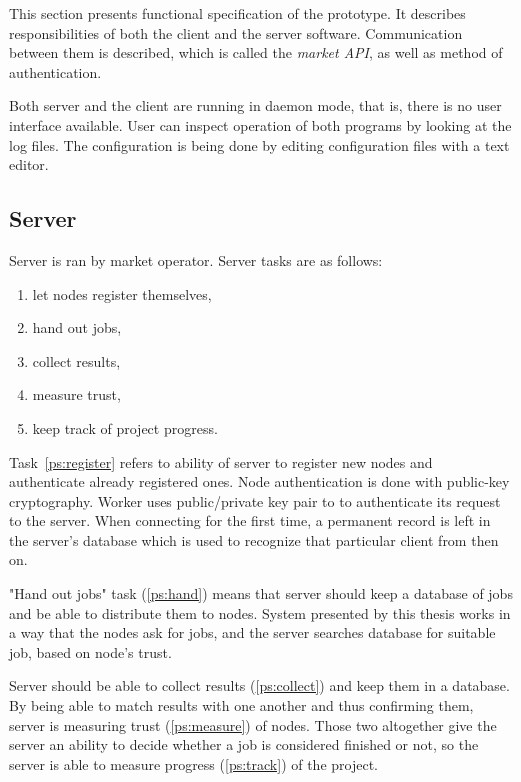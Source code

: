 This section presents functional specification of the prototype. It describes responsibilities of both the client and the server software. Communication between them is described, which is called the \emph{market API}, as well as method of authentication.

Both server and the client are running in daemon mode, that is, there is no user interface available. User can inspect operation of both programs by looking at the log files. The configuration is being done by editing configuration files with a text editor.

\subsection{Server}

Server is ran by market operator. Server tasks are as follows:

\begin{enumerate}
	\item \label{ps:register} let nodes register themselves,
	\item \label{ps:hand} hand out jobs,
	\item \label{ps:collect} collect results,
	\item \label{ps:measure} measure trust,
	\item \label{ps:track} keep track of project progress.
\end{enumerate}

Task~\ref{ps:register} refers to ability of server to register new nodes and authenticate already registered ones. Node authentication is done with public-key cryptography. Worker uses public/private key pair to to authenticate its request to the server. When connecting for the first time, a permanent record is left in the server's database which is used to recognize that particular client from then on.

"Hand out jobs" task (\ref{ps:hand}) means that server should keep a database of jobs and be able to distribute them to nodes. System presented by this thesis works in a way that the nodes ask for jobs, and the server searches database for suitable job, based on node's trust.

Server should be able to collect results (\ref{ps:collect}) and keep them in a database. By being able to match results with one another and thus confirming them, server is measuring trust (\ref{ps:measure}) of nodes. Those two altogether give the server an ability to decide whether a job is considered finished or not, so the server is able to measure progress (\ref{ps:track}) of the project.


